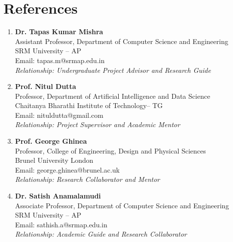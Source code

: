 \documentclass[a4paper,11pt]{article}
\begin{document}
\section{\textbf{References}}
\vspace{-0.2mm}
\small{
\begin{enumerate}[leftmargin=*,labelsep=2mm]
\item \textbf{Dr. Tapas Kumar Mishra}\\
   Assistant Professor, Department of Computer Science and Engineering\\
   SRM University – AP\\
   Email: tapas.m@srmap.edu.in\\
   \textit{Relationship: Undergraduate Project Advisor and Research Guide}

\item \textbf{Prof. Nitul Dutta}\\
   Professor, Department of Artificial Intelligence and Data Science\\
   Chaitanya Bharathi Institute of Technology– TG\\
   Email: nituldutta@gmail.com\\
   \textit{Relationship: Project Supervisor and Academic Mentor}

\item \textbf{Prof. George Ghinea}\\
   Professor, College of Engineering, Design and Physical Sciences\\
   Brunel University London\\
   Email: george.ghinea@brunel.ac.uk\\
   \textit{Relationship: Research Collaborator and Mentor}

\item \textbf{Dr. Satish Anamalamudi}\\
   Associate Professor, Department of Computer Science and Engineering\\
   SRM University – AP\\
   Email: sathish.a@srmap.edu.in\\
   \textit{Relationship: Academic Guide and Research Collaborator }
\end{enumerate}
}
\end{document}
